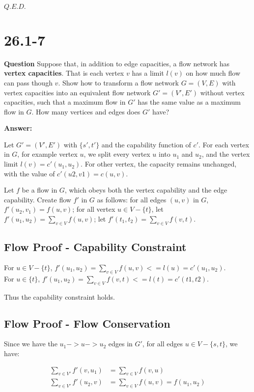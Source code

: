 \documentclass[12pt]{article}
\begin{document}
$Q.E.D.$

\section{26.1-7}
\textbf{Question} Suppose that, in addition to edge capacities, a flow network has \textbf{vertex capacities}. That is each vertex $v$ has a limit $l(v)$ on how much flow can pass though $v$. Show how to transform a flow network $G = (V, E)$ with vertex capacities into an equivalent flow network $G' = (V', E')$ without vertex capacities, such that a maximum flow in $G'$ has the same value as a maximum flow in $G$. How many vertices and edges does $G'$ have?

\textbf{Answer: }

Let $G'=(V', E')$ with $\{s',t'\}$ and the capability function of $c'$. For each vertex in $G$, for example vertex $u$, we split every vertex $u$ into $u_1$ and $u_2$, and the vertex limit $l(v) = c'(u_1,u_2)$. For other vertex, the capacity remains unchanged, with the value of $c'(u2,v1) = c(u,v)$.

Let $f$ be a flow in $G$, which obeys both the vertex capability and the edge capability. Create flow $f'$ in $G$ as follows: for all edges $(u,v)$ in $G$, $f'(u_2,v_1) = f(u,v)$; for all vertex $u \in V - \{t\}$, let $f'(u_1,u_2)=\sum_{v \in V} f(u,v)$; let $f'(t_1,t_2) = \sum_{v \in V}f(v,t)$.

\subsection{Flow Proof - Capability Constraint}
For $u \in V - \{ t\}$, $f'(u_1, u_2) = \sum_{v \in V} f(u,v) <= l(u) = c'(u_1, u_2)$. \\
For $u \in \{ t\}$, $f'(u_1, u_2) = \sum_{v \in V}f(v,t) <= l(t) = c'(t1, t2)$.

Thus the capability constraint holds.

\subsection{Flow Proof - Flow Conservation}
Since we have the $u_1 -> u -> u_2$ edges in $G'$, for all edges $u \in V - \{s, t\}$, we have: 

\begin{equation}
\begin{aligned}
\sum_{v \in V'} f'(v, u_1) &= \sum_{v \in V} f(v,u)\\
\sum_{v \in V'} f'(u_2, v) &= \sum_{v \in V} f(u,v) = f(u_1, u_2)
\end{aligned}
\end{equation}
\end{document}
